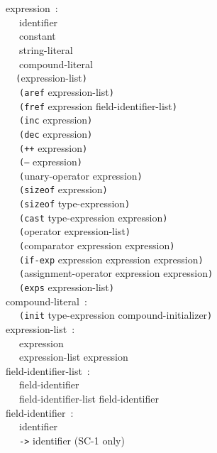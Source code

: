 \documentclass[a4]{article}
\def\|{\verb|} %|
\newcommand{\scoo}{{\rm \hfill (SC-1 only)}}
\begin{document}
\noindent
expression{\rm \ :} \\
\|  | identifier \\
\|  | constant \\
\|  | string-literal \\
\|  | compound-literal \\
\|  | {\tt (}expression-list{\tt )} \\
\|  | {\tt (aref} expression-list{\tt )} \\
\|  | {\tt (fref} expression field-identifier-list{\tt )} \\
\|  | {\tt (inc} expression{\tt )} \\
\|  | {\tt (dec} expression{\tt )} \\
\|  | {\tt (++} expression{\tt )} \\
\|  | {\tt (--} expression{\tt )} \\
\|  | {\tt (}unary-operator expression{\tt )} \\
\|  | {\tt (sizeof} expression{\tt )} \\
\|  | {\tt (sizeof} type-expression{\tt )} \\
\|  | {\tt (cast} type-expression expression{\tt )} \\
\|  | {\tt (}operator expression-list{\tt )} \\
\|  | {\tt (}comparator expression expression{\tt )} \\
\|  | {\tt (if-exp} expression expression expression{\tt )} \\
\|  | {\tt (}assignment-operator expression expression{\tt )} \\
\|  | {\tt (exps} expression-list{\tt )} \\

\noindent
compound-literal{\rm \ :} \\
\|  | {\tt (init} type-expression compound-initializer{\tt )} \\

\noindent
expression-list{\rm \ :} \\
\|  | expression \\
\|  | expression-list expression \\

\noindent
field-identifier-list{\rm \ :} \\
\|  | field-identifier \\
\|  | field-identifier-list field-identifier \\

\noindent
field-identifier{\rm \ :} \\
\|  | identifier \\
\|  | {\tt ->} identifier \scoo \\
\end{document}
